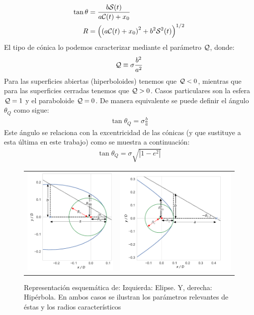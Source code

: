 \begin{align}
  \tan\theta &= \frac{b\mathcal{S}(t)}{a\mathcal{C}(t) + x_0} \label{eq:t-th-conversion} \\
  R &= \left(\left(a\mathcal{C}(t) + x_0\right)^2 + b^2\mathcal{S}^2(t)\right)^{1/2} 
\end{align}
El tipo de cónica lo podemos caracterizar mediante el parámetro $\mathcal{Q}$, donde:
\begin{align}
  \mathcal{Q} \equiv \sigma\frac{b^2}{a^2} \label{eq:conic-parameter-a-b}
\end{align}
Para las superficies abiertas (hiperboloides) tenemos que $\mathcal{Q} < 0$, mientras que para las superficies cerradas tenemos que $\mathcal{Q} > 0$. Casos particulares son la esfera $\mathcal{Q} = 1$ y el paraboloide $\mathcal{Q} = 0$. De manera equivalente se puede definir el ángulo $\theta_Q$ como sigue:
\begin{align}
  \tan\theta_Q = \sigma \frac{b}{a} \label{eq:thc}
\end{align}
Este ángulo se relaciona con la excentricidad de las cónicas (y que sustituye a esta última en este trabajo) como se muestra a continuación:
\begin{align}
  \tan\theta_Q = \sigma\sqrt{\left|1-e^2\right|}
\end{align}
\begin{figure}
  \begin{tabular}{cc}
    \includegraphics[width=0.4\linewidth]{./Figures/ellipse_edited} &
    \includegraphics[width=0.5\linewidth]{./Figures/hyperbola_edited}
  \end{tabular}
  \caption{Representación esquemática de: Izquierda: Elipse. Y, derecha: Hipérbola. En ambos casos se ilustran los parámetros relevantes de éstas y los radios característicos}
  \label{fig:conics}
\end{figure}

